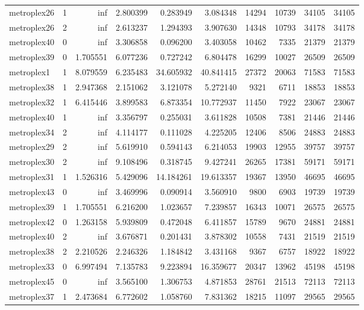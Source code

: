 \begin{longtable}{|l|r|r|r|r|r|r|r|r|r|}
metroplex26 & 1 & inf & 2.800399 & 0.283949 & 3.084348 & 14294 & 10739 & 34105 & 34105 \\
metroplex26 & 2 & inf & 2.613237 & 1.294393 & 3.907630 & 14348 & 10793 & 34178 & 34178 \\
metroplex40 & 0 & inf & 3.306858 & 0.096200 & 3.403058 & 10462 & 7335 & 21379 & 21379 \\
metroplex39 & 0 & 1.705551 & 6.077236 & 0.727242 & 6.804478 & 16299 & 10027 & 26509 & 26509 \\
metroplex1 & 1 & 8.079559 & 6.235483 & 34.605932 & 40.841415 & 27372 & 20063 & 71583 & 71583 \\
metroplex38 & 1 & 2.947368 & 2.151062 & 3.121078 & 5.272140 & 9321 & 6711 & 18853 & 18853 \\
metroplex32 & 1 & 6.415446 & 3.899583 & 6.873354 & 10.772937 & 11450 & 7922 & 23067 & 23067 \\
metroplex40 & 1 & inf & 3.356797 & 0.255031 & 3.611828 & 10508 & 7381 & 21446 & 21446 \\
metroplex34 & 2 & inf & 4.114177 & 0.111028 & 4.225205 & 12406 & 8506 & 24883 & 24883 \\
metroplex29 & 2 & inf & 5.619910 & 0.594143 & 6.214053 & 19903 & 12955 & 39757 & 39757 \\
metroplex30 & 2 & inf & 9.108496 & 0.318745 & 9.427241 & 26265 & 17381 & 59171 & 59171 \\
metroplex31 & 1 & 1.526316 & 5.429096 & 14.184261 & 19.613357 & 19367 & 13950 & 46695 & 46695 \\
metroplex43 & 0 & inf & 3.469996 & 0.090914 & 3.560910 & 9800 & 6903 & 19739 & 19739 \\
metroplex39 & 1 & 1.705551 & 6.216200 & 1.023657 & 7.239857 & 16343 & 10071 & 26575 & 26575 \\
metroplex42 & 0 & 1.263158 & 5.939809 & 0.472048 & 6.411857 & 15789 & 9670 & 24881 & 24881 \\
metroplex40 & 2 & inf & 3.676871 & 0.201431 & 3.878302 & 10558 & 7431 & 21519 & 21519 \\
metroplex38 & 2 & 2.210526 & 2.246326 & 1.184842 & 3.431168 & 9367 & 6757 & 18922 & 18922 \\
metroplex33 & 0 & 6.997494 & 7.135783 & 9.223894 & 16.359677 & 20347 & 13962 & 45198 & 45198 \\
metroplex45 & 0 & inf & 3.565100 & 1.306753 & 4.871853 & 28761 & 21513 & 72113 & 72113 \\
metroplex37 & 1 & 2.473684 & 6.772602 & 1.058760 & 7.831362 & 18215 & 11097 & 29565 & 29565 \\

\end{longtable}
